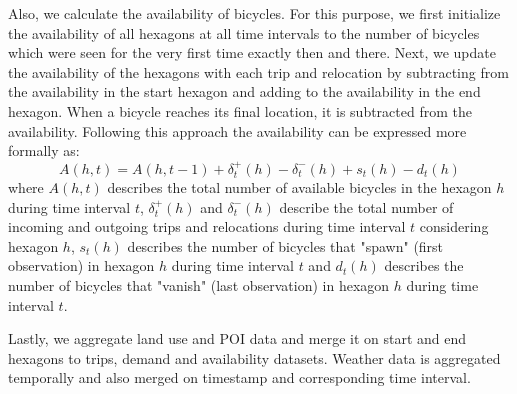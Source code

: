 Also, we calculate the availability of bicycles. For this purpose, we first initialize the availability of all hexagons at all time intervals to the number of bicycles which were seen for the very first time exactly then and there.
Next, we update the availability of the hexagons with each trip and relocation by subtracting from the availability in the start hexagon and adding to the availability in the end hexagon.
When a bicycle reaches its final location, it is subtracted from the availability.
Following this approach the availability can be expressed more formally as:
\[A(h, t) = A(h, t-1) + \delta_t^+(h) - \delta_t^-(h) + s_t(h) - d_t(h)\]
where \(A(h, t)\) describes the total number of available bicycles in the hexagon \(h\) during time interval \(t\),
\(\delta_t^+(h)\) and \(\delta_t^-(h)\) describe the total number of incoming and outgoing trips and relocations during time interval \(t\) considering hexagon \(h\),
\(s_t(h)\) describes the number of bicycles that "spawn" (first observation) in hexagon \(h\) during time interval \(t\) and
\(d_t(h)\) describes the number of bicycles that "vanish" (last observation) in hexagon \(h\) during time interval \(t\).

Lastly, we aggregate land use and POI data and merge it on start and end hexagons to trips, demand and availability datasets. Weather data is aggregated temporally and also merged on timestamp and corresponding time interval.